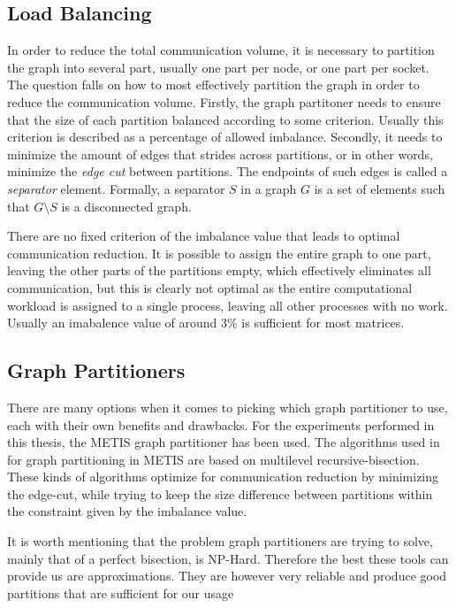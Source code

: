 \subsection{Load Balancing}
In order to reduce the total communication volume, it is necessary to partition the graph into several part, usually one part per node, or one part per socket. The question falls on how to most effectively partition the graph in order to reduce the communication volume. Firstly, the graph partitoner needs to ensure that the size of each partition balanced according to some criterion. Usually this criterion is described as a percentage of allowed imbalance. Secondly, it needs to minimize the amount of edges that strides across partitions, or in other words, minimize the \textit{edge cut} between partitions. The endpoints of such edges is called a \textit{separator} element. Formally, a separator \(S\) in a graph \(G\) is a set of elements such that \(G \setminus S\) is a disconnected graph.
\medskip

There are no fixed criterion of the imbalance value that leads to optimal communication reduction. It is possible to assign the entire graph to one part, leaving the other parts of the partitions empty, which effectively eliminates all communication, but this is clearly not optimal as the entire computational workload is assigned to a single process, leaving all other processes with no work. Usually an imabalence value of around 3\% is sufficient for most matrices.
\medskip


\subsection{Graph Partitioners}
There are many options when it comes to picking which graph partitioner to use, each with their own benefits and drawbacks. For the experiments performed in this thesis, the METIS graph partitioner has been used. The algorithms used in for graph partitioning in METIS are based on multilevel recursive-bisection. These kinds of algorithms optimize for communication reduction by minimizing the edge-cut, while trying to keep the size difference between partitions within the constraint given by the imbalance value.
\medskip

It is worth mentioning that the problem graph partitioners are trying to solve, mainly that of a perfect bisection, is NP-Hard. Therefore the best these tools can provide us are approximations. They are however very reliable and produce good partitions that are sufficient for our usage
\medskip


